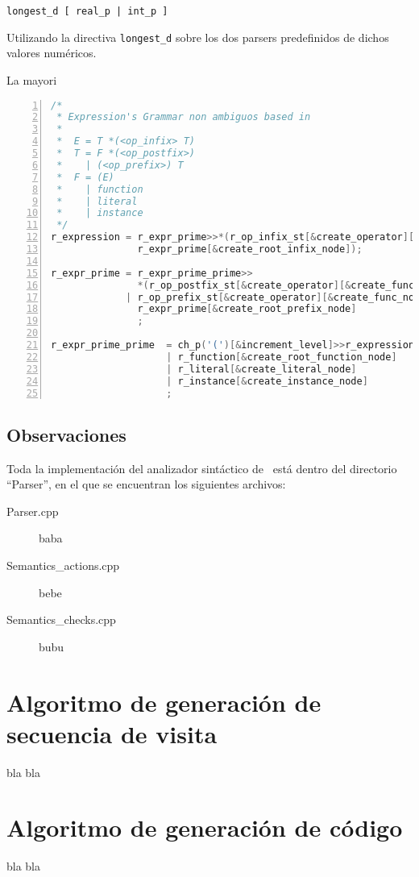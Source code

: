 \begin{lstlisting}[backgroundcolor=\color{white}]
longest_d [ real_p | int_p ]
\end{lstlisting}

Utilizando la directiva \texttt{longest\_d} sobre los dos parsers predefinidos de dichos valores numéricos.

La mayori

\begin{lstlisting}[language=C++, basicstyle=\scriptsize, numbers=left, numbersep=5pt, numberstyle=\tiny]
/*
 * Expression's Grammar non ambiguos based in
 *
 *  E = T *(<op_infix> T)
 *  T = F *(<op_postfix>)
 *    | (<op_prefix>) T
 *  F = (E)
 *    | function
 *    | literal
 *    | instance
 */
r_expression = r_expr_prime>>*(r_op_infix_st[&create_operator][&create_func_node]>>
               r_expr_prime[&create_root_infix_node]);

r_expr_prime = r_expr_prime_prime>>
               *(r_op_postfix_st[&create_operator][&create_func_node][&create_root_postfix_node])
             | r_op_prefix_st[&create_operator][&create_func_node]>>
               r_expr_prime[&create_root_prefix_node]
               ;

r_expr_prime_prime  = ch_p('(')[&increment_level]>>r_expression>>ch_p(')')[&decrement_level]
                    | r_function[&create_root_function_node]
                    | r_literal[&create_literal_node]
                    | r_instance[&create_instance_node]
                    ;
\end{lstlisting}

\subsection*{Observaciones}

Toda la implementación del analizador sintáctico de \maggen\ está dentro del directorio ``Parser'', en el que se encuentran los siguientes archivos:

\begin{description}
\item [Parser.cpp] baba
\item [Semantics\_actions.cpp] bebe
\item [Semantics\_checks.cpp] bubu
\end{description}

\section{Algoritmo de generación de secuencia de visita}

bla bla
\section{Algoritmo de generación de código}
bla bla
